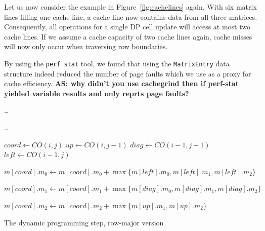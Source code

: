 \documentclass[runningheads,a4paper]{llncs}
\begin{document}
Let us now consider the example in Figure~\ref{fig:cachelines} again.
With six matrix lines filling one cache line, a cache line now contains data from all three matrices.
Consequently, all operations for a single DP cell update
will access at most two cache lines.
If we assume a cache capacity of two cache lines again, cache misses will now only occur when traversing row boundaries.

By using the \texttt{perf stat} tool, we found that using the \texttt{MatrixEntry} data structure indeed reduced
the number of page faults which we use as a proxy for cache efficiency.
{\bf AS: why didn't you use cachegrind then if perf-stat yielded variable results and only reprts page faults?}


\begin{algorithm}

\ldots{}
 {
	 {
		\ldots{}

		$coord \gets CO(i, j)$\;
		$up \gets CO(i, j-1)$\;
		$diag \gets CO(i-1, j-1)$\;
		$left \gets CO(i-1, j)$\;

		$m[coord].m_0 \gets m[coord].m_0 + \max\{m[left].m_0, m[left].m_1, m[left].m_2\}$\;

		$m[coord].m_1 \gets m[coord].m_1 + \max\{m[diag].m_0, m[diag].m_1, m[diag].m_2\}$\;

		$m[coord].m_2 \gets m[coord].m_2 + \max\{m[up].m_1, m[up].m_2\}$\;
	}
}

\caption{The dynamic programming step, row-major version}
\label{alg:dp}
\end{algorithm}
\end{document}
